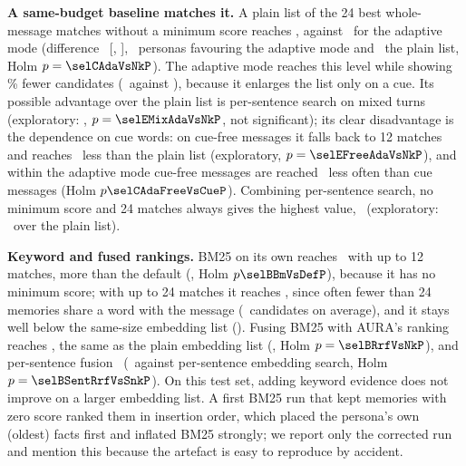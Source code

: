\IfFileExists{IEEEtran.cls}{\documentclass[journal]{IEEEtran}\def\HAVEIEEE{1}}{\documentclass[10pt,twocolumn]{article}\usepackage[margin=0.7in,columnsep=0.25in]{geometry}}
\newcommand{\aura}{AURA}
\begin{document}
\textbf{A same-budget baseline matches it.} A plain list of the 24 best whole-message matches without a minimum score reaches \selNominKk, against \selAdaptive\ for the adaptive mode (difference \selCAdaVsNk\ [\selCAdaVsNkLo, \selCAdaVsNkHi], \selCAdaVsNkPos\ personas favouring the adaptive mode and \selCAdaVsNkNeg\ the plain list, Holm $p=\selCAdaVsNkP$). The adaptive mode reaches this level while showing \selCandSaving\% fewer candidates (\selAdaptiveCand\ against \selNominKkCand), because it enlarges the list only on a cue. Its possible advantage over the plain list is per-sentence search on mixed turns (exploratory: \selEMixAdaVsNk, $p=\selEMixAdaVsNkP$, not significant); its clear disadvantage is the dependence on cue words: on cue-free messages it falls back to 12 matches and reaches \selEFreeAdaVsNk\ less than the plain list (exploratory, $p=\selEFreeAdaVsNkP$), and within the adaptive mode cue-free messages are reached \selCAdaFreeVsCue\ less often than cue messages (Holm $p\selCAdaFreeVsCueP$). Combining per-sentence search, no minimum score and 24 matches always gives the highest value, \selSentNominKk\ (exploratory: \selESnkVsNk\ over the plain list).

\textbf{Keyword and fused rankings.} BM25 on its own reaches \selBmTwelve\ with up to 12 matches, more than the default (\selBBmVsDef, Holm $p\selBBmVsDefP$), because it has no minimum score; with up to 24 matches it reaches \selBmTwentyfour, since often fewer than 24 memories share a word with the message (\selBmTwentyfourCand\ candidates on average), and it stays well below the same-size embedding list (\selBBmVsNk). Fusing BM25 with \aura's ranking reaches \selRrf, the same as the plain embedding list (\selBRrfVsNk, Holm $p=\selBRrfVsNkP$), and per-sentence fusion \selSentRrf\ (\selBSentRrfVsSnk\ against per-sentence embedding search, Holm $p=\selBSentRrfVsSnkP$). On this test set, adding keyword evidence does not improve on a larger embedding list. A first BM25 run that kept memories with zero score ranked them in insertion order, which placed the persona's own (oldest) facts first and inflated BM25 strongly; we report only the corrected run and mention this because the artefact is easy to reproduce by accident.
\end{document}

